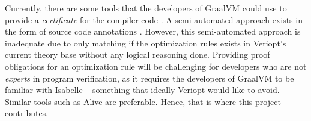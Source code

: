 Currently, there are some tools that the developers of GraalVM could use to provide a \emph{certificate} for the compiler code 
\cite[Sec. 7]{Term_Graph_Optimizations}. A semi-automated approach exists in the form of source code annotations \cite[Sec. 5.1]{Term_Graph_Optimizations}.
However, this semi-automated approach is inadequate due to only matching if the optimization rules exists in Veriopt's current theory base without 
any logical reasoning done. Providing proof obligations for an optimization rule will be challenging for developers who are not 
\emph{experts} in program verification, as it requires the developers of GraalVM to be familiar with Isabelle -- something that ideally Veriopt 
would like to avoid. Similar tools such as Alive \cite{AliveInLean} are preferable. Hence, that is where this project contributes.